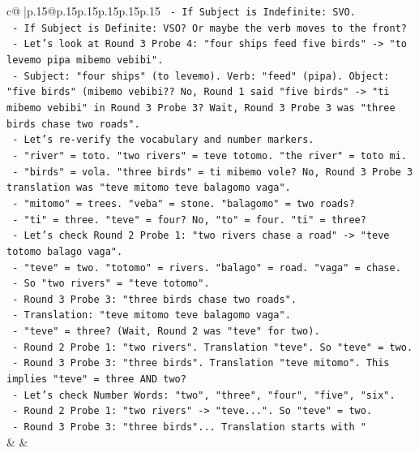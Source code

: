 \documentclass{article}
\begin{document}
{\begin{supertabular}{c@{$\;$}|p{.15\linewidth}@{}p{.15\linewidth}p{.15\linewidth}p{.15\linewidth}p{.15\linewidth}p{.15\linewidth}}
{{{\texttt{        {-}   If Subject is Indefinite: SVO.} \\
\texttt{        {-}   If Subject is Definite: VSO? Or maybe the verb moves to the front?} \\
\texttt{        {-}   Let's look at Round 3 Probe 4: "four ships feed five birds" {-}> "to levemo pipa mibemo vebibi".} \\
\texttt{            {-}   Subject: "four ships" (to levemo). Verb: "feed" (pipa). Object: "five birds" (mibemo vebibi?? No, Round 1 said "five birds" {-}> "ti mibemo vebibi" in Round 3 Probe 3? Wait, Round 3 Probe 3 was "three birds chase two roads".} \\
\texttt{            {-}   Let's re{-}verify the vocabulary and number markers.} \\
\texttt{            {-}   "river" = toto. "two rivers" = teve totomo. "the river" = toto mi.} \\
\texttt{            {-}   "birds" = vola. "three birds" = ti mibemo vole? No, Round 3 Probe 3 translation was "teve mitomo teve balagomo vaga".} \\
\texttt{                {-}   "mitomo" = trees. "veba" = stone. "balagomo" = two roads?} \\
\texttt{                {-}   "ti" = three. "teve" = four? No, "to" = four. "ti" = three?} \\
\texttt{                {-}   Let's check Round 2 Probe 1: "two rivers chase a road" {-}> "teve totomo balago vaga".} \\
\texttt{                {-}   "teve" = two. "totomo" = rivers. "balago" = road. "vaga" = chase.} \\
\texttt{                {-}   So "two rivers" = "teve totomo".} \\
\texttt{            {-}   Round 3 Probe 3: "three birds chase two roads".} \\
\texttt{                {-}   Translation: "teve mitomo teve balagomo vaga".} \\
\texttt{                {-}   "teve" = three? (Wait, Round 2 was "teve" for two).} \\
\texttt{                {-}   Round 2 Probe 1: "two rivers". Translation "teve". So "teve" = two.} \\
\texttt{                {-}   Round 3 Probe 3: "three birds". Translation "teve mitomo". This implies "teve" = three AND two?} \\
\texttt{                {-}   Let's check Number Words: "two", "three", "four", "five", "six".} \\
\texttt{                {-}   Round 2 Probe 1: "two rivers" {-}> "teve...". So "teve" = two.} \\
\texttt{                {-}   Round 3 Probe 3: "three birds"... Translation starts with "} \\
            }
        }
    }
    & & \\ \\


\end{supertabular}}
\end{document}
